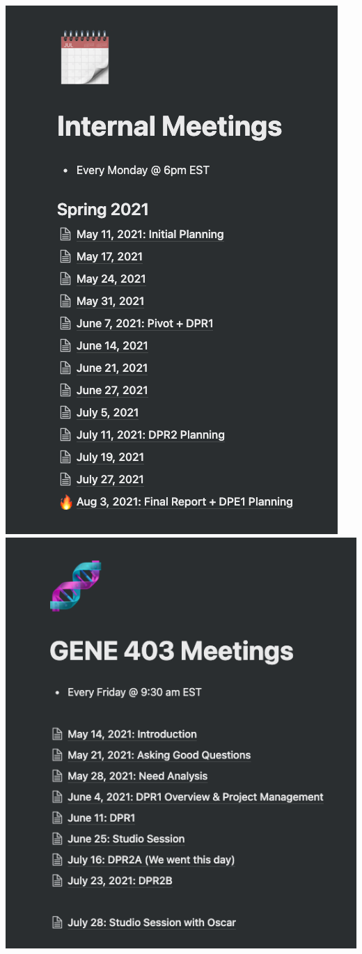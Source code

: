 \documentclass[a4paper,11pt]{article}
\begin{document}
\begin{center}
    \includegraphics[width={0.35\linewidth}]{img/notion/notion2.png}
    \includegraphics[width={0.3\linewidth}]{img/notion/notion3.png}

\end{center}
\end{document}

